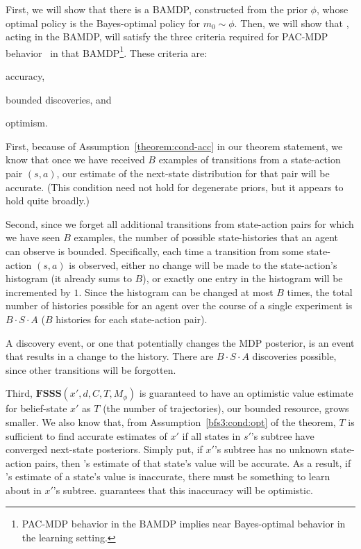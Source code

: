 \begin{proofsketch}

First, we will show that there is a BAMDP, constructed from the prior $\phi$, whose optimal policy is the Bayes-optimal policy for $m_0\sim \phi$. Then, we will show that , acting in the BAMDP, will satisfy the three criteria required for PAC-MDP behavior~\cite{kakade03,lihong09pacmdp} in that BAMDP\footnote{PAC-MDP behavior in the BAMDP implies near Bayes-optimal behavior in the learning setting.}.
These criteria are: \begin{inparaenum} \item accuracy, \item bounded discoveries, and \item optimism. \end{inparaenum}

First, because of Assumption~\ref{theorem:cond-acc} in our theorem statement, we know that once we have received $B$ examples of transitions from a state-action pair $(s,a)$, our estimate of the next-state distribution for that pair will be accurate.  (This condition need not hold for degenerate priors, but it appears to hold quite broadly.)

Second, since we forget all additional transitions from state-action pairs for which we have seen $B$ examples, the number of possible state-histories that an agent can observe is bounded.  Specifically, each time a transition from some state-action $(s,a)$ is observed, either no change will be made to the state-action's histogram (it already sums to $B$), or exactly one entry in the histogram will be incremented by $1$.  Since the histogram can be changed at most $B$ times, the total number of histories possible for an agent over the course of a single experiment is $B \cdot S \cdot A$ ($B$ histories for each state-action pair).

A discovery event, or one that potentially changes the MDP posterior, is an event that results in a change to the history. There are $B \cdot S \cdot A$ discoveries possible, since other transitions will be forgotten.

Third, $\mathbf{FSSS}(x',d,C,T,M_\phi)$ is guaranteed to have an optimistic value estimate for belief-state $x'$ as $T$ (the number of trajectories), our bounded resource, grows smaller. We also know that, from Assumption~\ref{bfs3:cond:opt} of the theorem, $T$ is sufficient to find accurate estimates of $x'$ if all states in $s'$'s subtree have converged next-state posteriors. Simply put, if $x'$'s subtree has no unknown state-action pairs, then 's estimate of that state's value will be accurate.  As a result, if 's estimate of a state's value is inaccurate, there must be something to learn about in $x'$'s subtree.  guarantees that this inaccuracy will be optimistic.


\end{proofsketch}
